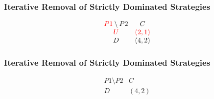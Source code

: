 \begin{frame}
    \frametitle{Iterative Removal of Strictly Dominated Strategies}
    \begin{equation*}
        \begin{matrix}
            \textcolor{red}{P1}\setminus P2 & C \\
            \textcolor{red}{U} & \textcolor{red}{(2,1)} \\
            D & (4,2) \\
        \end{matrix}
    \end{equation*}
\end{frame}


\begin{frame}
    \frametitle{Iterative Removal of Strictly Dominated Strategies}
    \begin{equation*}
        \begin{matrix}
            P1\setminus P2 & C \\
            D & (4,2) \\
        \end{matrix}
    \end{equation*}
\end{frame}